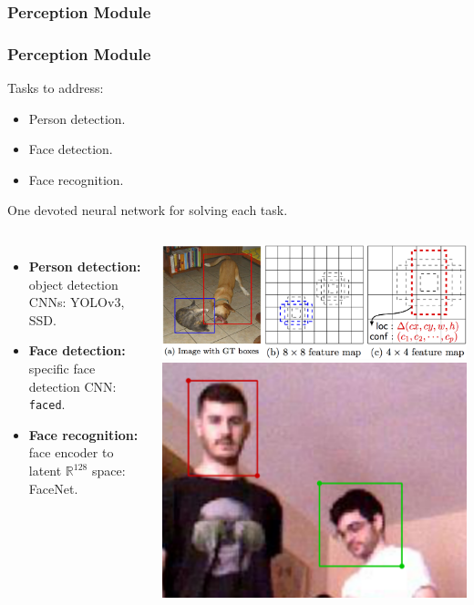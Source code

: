 \documentclass[11pt]{beamer}
\begin{document}
\subsubsection{Perception Module}
\begin{frame}[allowframebreaks]
	\frametitle{Perception Module}
	Tasks to address:
	\begin{itemize}
		\item Person detection.
		\item Face detection.
		\item Face recognition.
	\end{itemize}
	\vspace{8cm}
	One devoted neural network for solving each task.\\
	\begin{columns}
		\begin{itemize}
			\item \textbf{Person detection:} object detection CNNs: YOLOv3, \alert{SSD}.
			\vspace{0.8cm}
			\item \textbf{Face detection:} specific face detection CNN: \alert{\texttt{faced}}.
			\vspace{0.8cm}
			\item \textbf{Face recognition:} face encoder to latent $\mathbb{R}^{128}$ space: \alert{FaceNet}.
		\end{itemize}
		\begin{center}
			\includegraphics[width=\linewidth]{ssd_generated_boxes}\\
			\includegraphics[width=0.4\linewidth]{face_detection}\\

\end{center}
\end{columns}
\end{frame}
\end{document}
